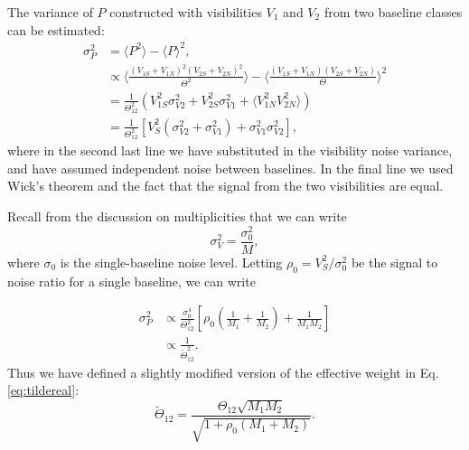 \documentclass[twocolumn,apj,numberedappendix]{emulateapj}
\renewcommand\[{\begin{equation}}
\renewcommand\]{\end{equation}}
\begin{document}
The variance of $P$ constructed with visibilities $V_1$ and $V_2$ from two baseline classes can be estimated:
\begin{equation}
\begin{aligned}
\sigma_P^2 &= \langle P^2\rangle -\langle P \rangle^2,\\
&\propto \langle \frac{(V_{1S}+V_{1N})^2 (V_{2S}+V_{2N})^2}{\Theta^2} \rangle - \langle \frac{(V_{1S}+V_{1N}) (V_{2S}+V_{2N})}{\Theta} \rangle ^2\\
&= \frac{1}{\Theta_{12}^2} \left( V_{1S}^2\sigma_{V2}^2+V_{2S}^2\sigma_{V1}^2+\langle V_{1N}^2 V_{2N}^2\rangle\right)\\
&= \frac{1}{\Theta_{12}^2} \left[ V_{S}^2(\sigma_{V2}^2+\sigma_{V1}^2) + \sigma_{V1}^2 \sigma_{V2}^2\right], 
\end{aligned}
\end{equation}
where in the second last line we have substituted in the visibility noise variance, and have assumed independent noise between baselines. In the final line we used Wick's theorem and the fact that the signal from the two visibilities are equal. 

Recall from the discussion on multiplicities that we can write
\begin{equation}
\sigma_V^2=\frac{\sigma_0^2}{M},
\end{equation}
where $\sigma_0$ is the single-baseline noise level. Letting $\rho_0=V_S^2/\sigma_0^2$ be the signal to noise ratio for a single baseline, we can write

\begin{equation}
\begin{aligned}
\sigma_P^2 & \propto  \frac{\sigma_0^4}{\Theta_{12}^2} \left[ \rho_0 \left(\frac{1}{M_1}+\frac{1}{M_2} \right) + \frac{1}{M_1 M_2}\right]\\
&\propto \frac{1}{\widetilde{\Theta}_{12}^2}.
\end{aligned}
\end{equation}
Thus we have defined a slightly modified version of the effective weight in Eq.  \eqref{eq:tildereal}:
\begin{equation}
\widetilde{\Theta}_{12}=\frac{\Theta_{12}\sqrt{M_1M_{2}}}{\sqrt{1 + \rho_0 \left(M_1+M_{2} \right)}}.
\end{equation}







\end{document}
